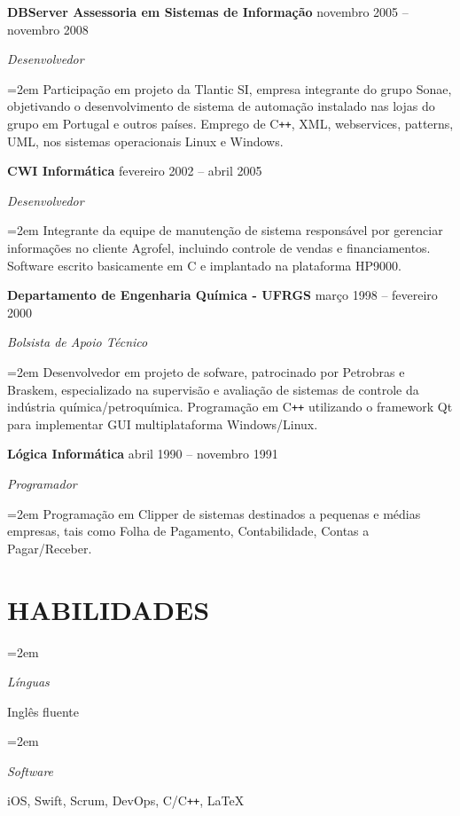 \documentclass[paper=a4,fontsize=11pt]{scrartcl} %
\newlength{\spacebox}
\newcommand{\sepspace}{\vspace*{1em}}		%
\newcommand{\NewPart}[1]{\section*{\uppercase{#1}}}
\newcommand{\PersonalEntry}[2]{
		\noindent\hangindent=2em\hangafter=0 %
		\parbox{\spacebox}{        %
		\textit{#1}}		       %
		\hspace{1.5em} #2 \par}    %
\newcommand{\SkillsEntry}[2]{      %
		\noindent\hangindent=2em\hangafter=0 %
		\parbox{\spacebox}{        %
		\textit{#1}}			   %
		\hspace{1.5em} #2 \par}    %
\newcommand{\EducationEntry}[4]{
		\noindent \textbf{#1} \hfill      %
        #2 \par
		\noindent \textit{#3} \par        %
		\noindent\hangindent=2em\hangafter=0 \small #4 %
		\normalsize \par}
\newcommand{\WorkEntry}[4]{				  %
		\noindent \textbf{#1} \hfill      %
        #2 \par
		\noindent \textit{#3} \par        %
		\noindent\hangindent=2em\hangafter=0 \small #4 %
		\normalsize \par}
\begin{document}
\WorkEntry{DBServer Assessoria em Sistemas de Informação}{novembro 2005 – novembro 2008}{Desenvolvedor}{Participação em projeto da Tlantic SI, empresa integrante do grupo Sonae, objetivando o desenvolvimento de sistema de automação instalado nas lojas do grupo em Portugal e outros países. Emprego de C\texttt{++}, XML, webservices, patterns, UML, nos sistemas operacionais Linux e Windows.}
\sepspace
\sepspace

\WorkEntry{CWI Informática}{fevereiro 2002 – abril 2005}{Desenvolvedor}{Integrante da equipe de manutenção de sistema responsável por gerenciar informações no cliente Agrofel, incluindo controle de vendas e financiamentos. Software escrito basicamente em C e implantado na plataforma HP9000.}
\sepspace
\sepspace

\WorkEntry{Departamento de Engenharia Química - UFRGS}{março 1998 – fevereiro 2000}{Bolsista de Apoio Técnico}{Desenvolvedor em projeto de sofware, patrocinado por Petrobras e Braskem, especializado na supervisão e avaliação de sistemas de controle da indústria química/petroquímica. Programação em C\texttt{++} utilizando o framework Qt para implementar GUI multiplataforma Windows/Linux.}
\sepspace
\sepspace

\WorkEntry{Lógica Informática}{abril 1990 – novembro 1991}{Programador}{Programação em Clipper de sistemas destinados a pequenas e médias empresas, tais como Folha de Pagamento, Contabilidade, Contas a Pagar/Receber.}

\NewPart{Habilidades}{}

\SkillsEntry{Línguas}{Inglês fluente}

\SkillsEntry{Software}{iOS, Swift, Scrum, DevOps, C/C\texttt{++}, \LaTeX}


\end{document}
